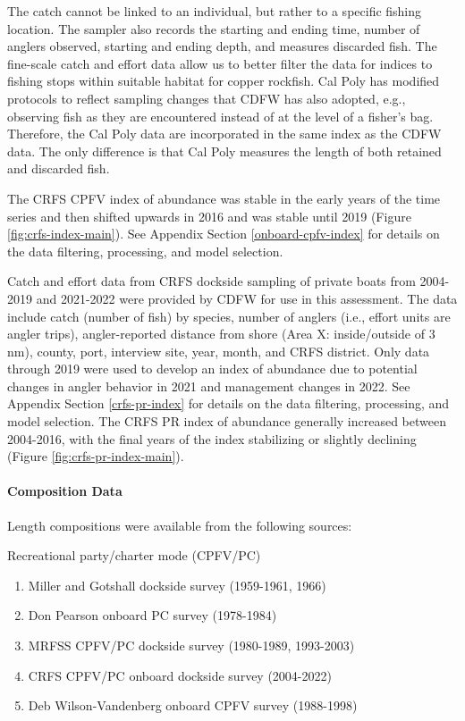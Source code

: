 \documentclass[11pt,
  letterpaper,
]{article}
\begin{document}
The catch cannot be linked to an individual, but rather to a specific fishing location. The sampler also records the starting and ending time, number of anglers observed, starting and ending depth, and measures discarded fish. The fine-scale catch and effort data allow us to better filter the data for indices to fishing stops within suitable habitat for copper rockfish. Cal Poly has modified protocols to reflect sampling changes that CDFW has also adopted, e.g., observing fish as they are encountered instead of at the level of a fisher's bag. Therefore, the Cal Poly data are incorporated in the same index as the CDFW data. The only difference is that Cal Poly measures the length of both retained and discarded fish.

The CRFS CPFV index of abundance was stable in the early years of the time series and then shifted upwards in 2016 and was stable until 2019 (Figure \ref{fig:crfs-index-main}). See Appendix Section \ref{onboard-cpfv-index} for details on the data filtering, processing, and model selection.

Catch and effort data from CRFS dockside sampling of private boats from 2004-2019 and 2021-2022 were provided by CDFW for use in this assessment. The data include catch (number of fish) by species, number of anglers (i.e., effort units are angler trips), angler-reported distance from shore (Area X: inside/outside of 3 nm), county, port, interview site, year, month, and CRFS district. Only data through 2019 were used to develop an index of abundance due to potential changes in angler behavior in 2021 and management changes in 2022. See Appendix Section \ref{crfs-pr-index} for details on the data filtering, processing, and model selection. The CRFS PR index of abundance generally increased between 2004-2016, with the final years of the index stabilizing or slightly declining (Figure \ref{fig:crfs-pr-index-main}).

\paragraph{Composition Data}\label{composition-data-1}

Length compositions were available from the following sources:

Recreational party/charter mode (CPFV/PC)

\begin{enumerate}
  \item Miller and Gotshall dockside survey (1959-1961, 1966)
  \item Don Pearson onboard PC survey (1978-1984)
  \item MRFSS CPFV/PC dockside survey (1980-1989, 1993-2003)
  \item CRFS CPFV/PC onboard dockside survey (2004-2022)
  \item Deb Wilson-Vandenberg onboard CPFV survey (1988-1998)
\end{enumerate}
\end{document}
